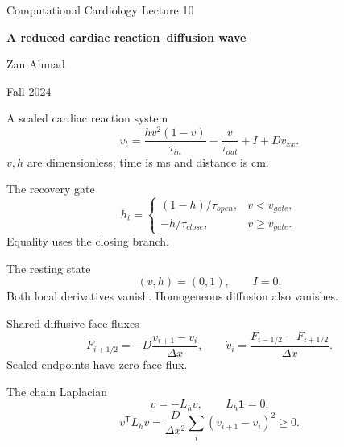 \documentclass[aspectratio=169,11pt]{beamer}
\newcommand{\notestarget}{notes.pdf}\newcommand{\noteslabel}{Notes}
\begin{document}
\begin{frame}[plain]\vfill
{\small\color{accent} Computational Cardiology \quad Lecture 10}\par\medskip
{\raggedright{}\LARGE\bfseries\color{ink} A reduced cardiac reaction--diffusion wave}\par\bigskip
Zan Ahmad\par\smallskip
{\small Fall 2024}\par\vfill\end{frame}
\renewcommand{\notestarget}{notes.pdf\#note-the-scaled-cardiac-reaction-system}
\begin{frame}[t,fragile,label=slide-a-scaled-cardiac-reaction-system]{A scaled cardiac reaction system}
\[v_t=\frac{hv^2(1-v)}{\tau_{in}}-\frac v{\tau_{out}}+I+Dv_{xx}.\]\pause{} $v,h$ are dimensionless; time is ms and distance is cm.
\end{frame}
\renewcommand{\notestarget}{notes.pdf\#note-the-scaled-cardiac-reaction-system}
\begin{frame}[t,fragile,label=slide-the-recovery-gate]{The recovery gate}
\[h_t=\begin{cases}(1-h)/\tau_{open},&v<v_{gate},\\-h/\tau_{close},&v\ge v_{gate}.\end{cases}\]\pause{} Equality uses the closing branch.
\end{frame}
\renewcommand{\notestarget}{notes.pdf\#note-the-scaled-cardiac-reaction-system}
\begin{frame}[t,fragile,label=slide-the-resting-state]{The resting state}
\[(v,h)=(0,1),\qquad I=0.\]\pause{} Both local derivatives vanish. Homogeneous diffusion also vanishes.
\end{frame}
\renewcommand{\notestarget}{notes.pdf\#note-conservative-coupling-on-a-sealed-strand}
\begin{frame}[t,fragile,label=slide-shared-diffusive-face-fluxes]{Shared diffusive face fluxes}
\[F_{i+1/2}=-D\frac{v_{i+1}-v_i}{\Delta x},\qquad\dot v_i=\frac{F_{i-1/2}-F_{i+1/2}}{\Delta x}.\]\pause{} Sealed endpoints have zero face flux.
\end{frame}
\renewcommand{\notestarget}{notes.pdf\#note-conservative-coupling-on-a-sealed-strand}
\begin{frame}[t,fragile,label=slide-the-chain-laplacian]{The chain Laplacian}
\[\dot v=-L_hv,\qquad L_h\boldsymbol1=0.\]\pause{}\[v^{\mathsf T}L_hv=\frac D{\Delta x^2}\sum_i(v_{i+1}-v_i)^2\ge0.\]
\end{frame}
\renewcommand{\notestarget}{notes.pdf\#note-gate-reaction-and-diffusion-substeps}
\end{document}
